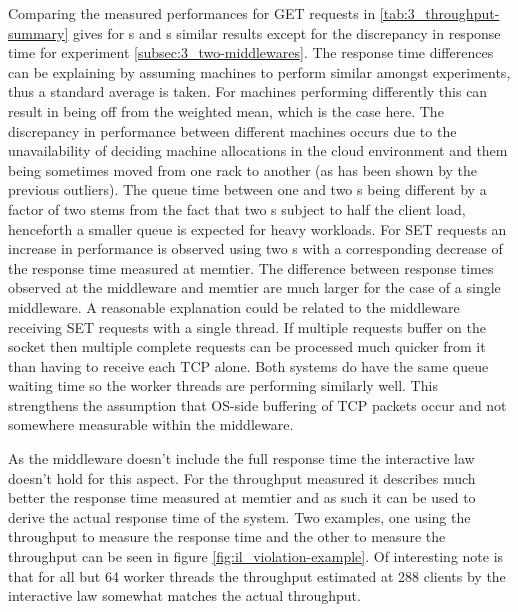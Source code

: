         Comparing the measured performances for GET requests in \ref{tab:3_throughput-summary} gives for \cli{}s and
        \mw{}s similar results except for the discrepancy in response time for experiment
        \ref{subsec:3_two-middlewares}. The response time differences can be explaining by assuming machines to perform
        similar amongst experiments, thus a standard average is taken. For machines performing differently this can
        result in being off from the weighted mean, which is the case here. The discrepancy in performance between
        different machines occurs due to the unavailability of deciding machine allocations in the cloud environment and
        them being sometimes moved from one rack to another (as has been shown by the previous outliers). The queue time
        between one and two \mw{}s being different by a factor of two stems from the fact that two \mw{}s subject to
        half the client load, henceforth a smaller queue is expected for heavy workloads.\newline
        For SET requests an increase in performance is observed using two \mw{}s with a corresponding decrease of the
        response time measured at memtier. The difference between response times observed at the middleware and memtier
        are much larger for the case of a single middleware. A reasonable explanation could be related to the middleware
        receiving SET requests with a single thread. If multiple requests buffer on the socket then multiple complete
        requests can be processed much quicker from it than having to receive each TCP alone. Both systems do have the
        same queue waiting time so the worker threads are performing similarly well. This strengthens the assumption
        that OS-side buffering of TCP packets occur and not somewhere measurable within the middleware.

        As the middleware doesn't include the full response time the interactive law doesn't hold for this aspect. For
        the throughput measured it describes much better the response time measured at memtier and as such it can be
        used to derive the actual response time of the system. Two examples, one using the throughput to measure the
        response time and the other to measure the throughput can be seen in figure \ref{fig:il_violation-example}.
        Of interesting note is that for all but 64 worker threads the throughput estimated at 288 clients by the
        interactive law somewhat matches the actual throughput.

